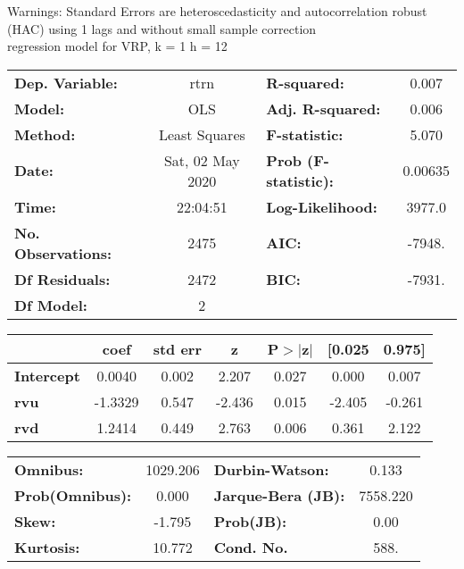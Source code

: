 Warnings: \newline
 [1] Standard Errors are heteroscedasticity and autocorrelation robust (HAC) using 1 lags and without small sample correction\\ 

regression model for VRP, k = 1 h = 12\begin{center}
\begin{tabular}{lclc}
\toprule
\textbf{Dep. Variable:}    &       rtrn       & \textbf{  R-squared:         } &     0.007   \\
\textbf{Model:}            &       OLS        & \textbf{  Adj. R-squared:    } &     0.006   \\
\textbf{Method:}           &  Least Squares   & \textbf{  F-statistic:       } &     5.070   \\
\textbf{Date:}             & Sat, 02 May 2020 & \textbf{  Prob (F-statistic):} &  0.00635    \\
\textbf{Time:}             &     22:04:51     & \textbf{  Log-Likelihood:    } &    3977.0   \\
\textbf{No. Observations:} &        2475      & \textbf{  AIC:               } &    -7948.   \\
\textbf{Df Residuals:}     &        2472      & \textbf{  BIC:               } &    -7931.   \\
\textbf{Df Model:}         &           2      & \textbf{                     } &             \\
\bottomrule
\end{tabular}
\begin{tabular}{lcccccc}
                   & \textbf{coef} & \textbf{std err} & \textbf{z} & \textbf{P$> |$z$|$} & \textbf{[0.025} & \textbf{0.975]}  \\
\midrule
\textbf{Intercept} &       0.0040  &        0.002     &     2.207  &         0.027        &        0.000    &        0.007     \\
\textbf{rvu}       &      -1.3329  &        0.547     &    -2.436  &         0.015        &       -2.405    &       -0.261     \\
\textbf{rvd}       &       1.2414  &        0.449     &     2.763  &         0.006        &        0.361    &        2.122     \\
\bottomrule
\end{tabular}
\begin{tabular}{lclc}
\textbf{Omnibus:}       & 1029.206 & \textbf{  Durbin-Watson:     } &    0.133  \\
\textbf{Prob(Omnibus):} &   0.000  & \textbf{  Jarque-Bera (JB):  } & 7558.220  \\
\textbf{Skew:}          &  -1.795  & \textbf{  Prob(JB):          } &     0.00  \\
\textbf{Kurtosis:}      &  10.772  & \textbf{  Cond. No.          } &     588.  \\
\bottomrule
\end{tabular}
\end{center}

